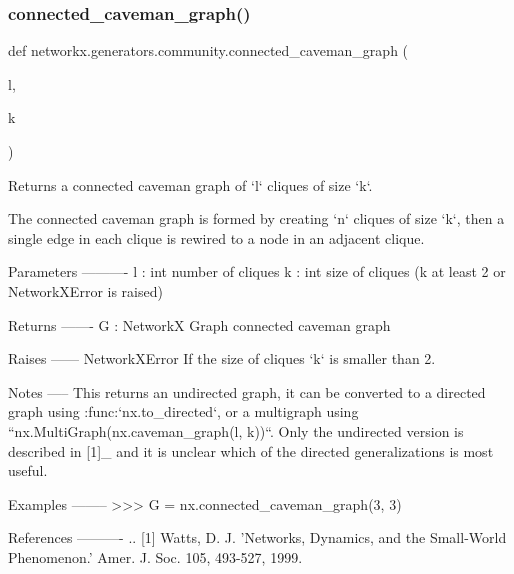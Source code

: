\subsubsection{\texorpdfstring{connected\+\_\+caveman\+\_\+graph()}{connected\_caveman\_graph()}}
{\footnotesize\ttfamily def networkx.\+generators.\+community.\+connected\+\_\+caveman\+\_\+graph (\begin{DoxyParamCaption}\item[{}]{l,  }\item[{}]{k }\end{DoxyParamCaption})}

\begin{DoxyVerb}Returns a connected caveman graph of `l` cliques of size `k`.

The connected caveman graph is formed by creating `n` cliques of size
`k`, then a single edge in each clique is rewired to a node in an
adjacent clique.

Parameters
----------
l : int
  number of cliques
k : int
  size of cliques (k at least 2 or NetworkXError is raised)

Returns
-------
G : NetworkX Graph
  connected caveman graph

Raises
------
NetworkXError
    If the size of cliques `k` is smaller than 2.

Notes
-----
This returns an undirected graph, it can be converted to a directed
graph using :func:`nx.to_directed`, or a multigraph using
``nx.MultiGraph(nx.caveman_graph(l, k))``. Only the undirected version is
described in [1]_ and it is unclear which of the directed
generalizations is most useful.

Examples
--------
>>> G = nx.connected_caveman_graph(3, 3)

References
----------
.. [1] Watts, D. J. 'Networks, Dynamics, and the Small-World Phenomenon.'
   Amer. J. Soc. 105, 493-527, 1999.
\end{DoxyVerb}
 \mbox{\label{namespacenetworkx_1_1generators_1_1community_a252376cc2f95931d973271551c25bd1f}} 
